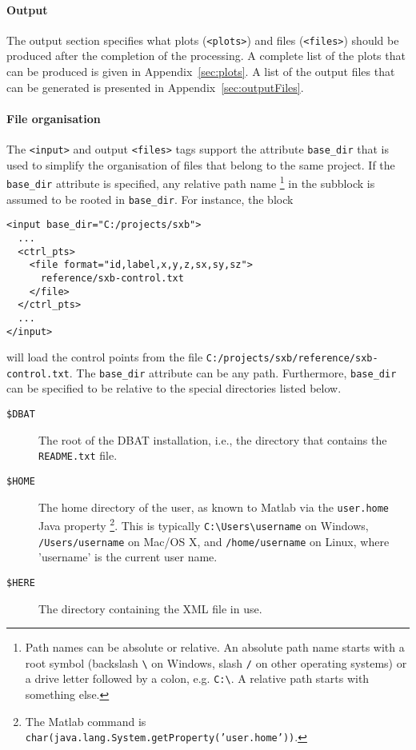 \documentclass{article}
\begin{document}
\paragraph{Output}
\label{sec:orgd8a706e}
The output section specifies what plots (\texttt{<plots>}) and files
(\texttt{<files>}) should be produced after the completion of the processing.
A complete list of the plots that can be produced is given in
Appendix~\ref{sec:plots}. A list of the output files that can be
generated is presented in Appendix~\ref{sec:outputFiles}.
\paragraph{File organisation}
\label{sec:fileOrganisation}
\sloppy
The \texttt{<input>} and output \texttt{<files>} tags support the attribute
\texttt{base\_dir} that is used to simplify the organisation of files that
belong to the same project. If the \texttt{base\_dir} attribute is specified,
any relative path name \footnote{Path names can be absolute or relative. An absolute
path name starts with a root symbol (backslash \texttt{\textbackslash{}} on Windows, slash
\texttt{/} on other operating systems) or a drive letter followed by a
colon, e.g. \texttt{C:\textbackslash{}}. A relative path starts with something else.} in the subblock is assumed to
be rooted in \texttt{base\_dir}. For instance, the block
\begin{verbatim}
<input base_dir="C:/projects/sxb">
  ...
  <ctrl_pts>
    <file format="id,label,x,y,z,sx,sy,sz">
      reference/sxb-control.txt
    </file>
  </ctrl_pts>
  ...
</input>
\end{verbatim}
will load the control points from the file
\texttt{C:/projects/sxb/reference/sxb-control.txt}. The \texttt{base\_dir} attribute
can be any path. Furthermore, \texttt{base\_dir} can be specified to be
relative to the special directories listed below.

\sloppy
\begin{description}
\item[{\texttt{\$DBAT}}] The root of the DBAT installation, i.e., the directory
that contains the \texttt{README.txt} file.
\item[{\texttt{\$HOME}}] The home directory of the user, as known to Matlab via
the \texttt{user.home} Java property \footnote{The Matlab command is
\texttt{char(java.lang.System.getProperty('user.home'))}.}. This
is typically \texttt{C:\textbackslash{}Users\textbackslash{}username} on Windows,
\texttt{/Users/username} on Mac/OS X, and \texttt{/home/username} on
Linux, where 'username' is the current user name.
\item[{\texttt{\$HERE}}] The directory containing the XML file in use.
\end{description}
\end{document}
